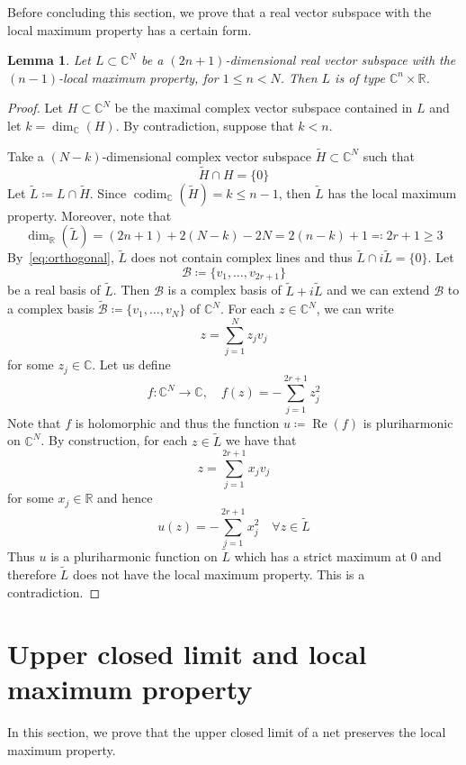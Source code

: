 \documentclass[reqno,oneside]{amsart}
\newcommand{\numberset}{\mathbb}
\newcommand{\R}{\numberset{R}}
\newcommand{\C}{\numberset{C}}
\DeclareMathOperator{\Realpart}{Re}
\renewcommand{\Re}{\Realpart}
\DeclareMathOperator{\codim}{codim}
\theoremstyle{definition}
\theoremstyle{plain}
\newtheorem{lemma}[definition]{Lemma}
\theoremstyle{remark}
\begin{document}
Before concluding this section, we prove that a real vector subspace with the local maximum property has a certain form.
\begin{lemma}
\label{lemma:type}
	Let $L\subset\C^N$ be a $(2n+1)$-dimensional real vector subspace with the $(n-1)$-local maximum property, for $1\leq n<N$. Then $L$ is of type $\C^n\times\R$.
\end{lemma}
\begin{proof}
	Let $H\subset\C^N$ be the maximal complex vector subspace contained in $L$ and let $k=\dim_\C(H)$. By contradiction, suppose that $k<n$.  
	
	Take a $(N-k)$-dimensional complex vector subspace $\tilde{H}\subset\C^N$ such that
	\begin{equation}
	\label{eq:orthogonal}
		\tilde{H}\cap H=\{0\}
	\end{equation}
	Let $\tilde{L}\coloneqq L\cap\tilde{H}$. Since $\codim_\C(\tilde{H})=k\leq n-1$, then $\tilde{L}$ has the local maximum property. Moreover, note that
	\[
		\dim_\R(\tilde{L})=(2n+1)+2(N-k)-2N=2(n-k)+1\eqqcolon2r+1\geq3
	\]
	By~\eqref{eq:orthogonal}, $\tilde{L}$ does not contain complex lines and thus $\tilde{L}\cap i\tilde{L}=\{0\}$. Let 
	\[
		\mathcal{B}\coloneqq\{v_1,\dots,v_{2r+1}\}
	\]    
	be a real basis of $\tilde{L}$. Then $\mathcal{B}$ is a complex basis of $\tilde{L}+i\tilde{L}$ and we can extend $\mathcal{B}$ to a complex basis $\tilde{\mathcal{B}}\coloneqq\{v_1,\dots,v_N\}$ of $\C^N$. For each $z\in\C^N$, we can write
	\[
		z=\sum_{j=1}^N z_jv_j
	\]
	for some $z_j\in\C$. Let us define
	\[
		f:\C^N\to\C, \quad f(z)=-\sum_{j=1}^{2r+1} z_j^2
	\]
	Note that $f$ is holomorphic and thus the function $u\coloneqq\Re(f)$ is pluriharmonic on $\C^N$. By construction, for each $z\in\tilde{L}$ we have that
	\[
		z=\sum_{j=1}^{2r+1} x_jv_j
	\]
	for some $x_j\in\R$ and hence
	\[
		u(z)=-\sum_{j=1}^{2r+1} x_j^2 \quad \forall z\in\tilde{L}
	\]
	Thus $u$ is a pluriharmonic function on $\tilde{L}$ which has a strict maximum at $0$ and therefore $\tilde{L}$ does not have the local maximum property. This is a contradiction.
\end{proof}


\section{Upper closed limit and local maximum property}
\label{sec:limit}
In this section, we prove that the upper closed limit of a net preserves the local maximum property.
\end{document}
